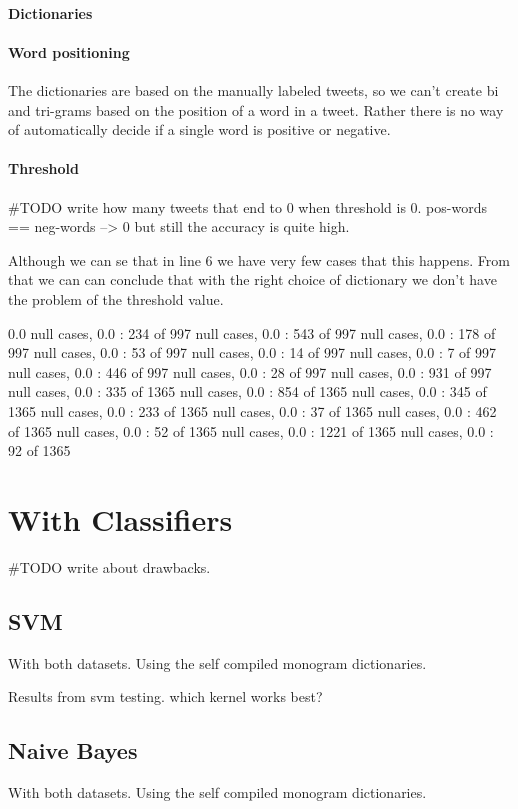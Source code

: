 \paragraph{Dictionaries}
\paragraph{Word positioning}
The dictionaries are based on the manually labeled
tweets, so we can't create bi and tri-grams based on the position of a word in a tweet.
Rather there is no way of automatically decide if a single word is positive or
negative. 

\paragraph{Threshold}
#TODO write how many tweets that end to 0 when threshold is 0.
pos-words == neg-words --> 0 but still the accuracy is quite high.

Although we can se that in line 6 we have very few cases that this happens.
From that we can can conclude that with the right choice of dictionary we don't
have the problem of the threshold value. 

0.0
null cases, 0.0 : 234 of 997
null cases, 0.0 : 543 of 997
null cases, 0.0 : 178 of 997
null cases, 0.0 : 53 of 997
null cases, 0.0 : 14 of 997
null cases, 0.0 : 7 of 997
null cases, 0.0 : 446 of 997
null cases, 0.0 : 28 of 997
null cases, 0.0 : 931 of 997
null cases, 0.0 : 335 of 1365
null cases, 0.0 : 854 of 1365
null cases, 0.0 : 345 of 1365
null cases, 0.0 : 233 of 1365
null cases, 0.0 : 37 of 1365
null cases, 0.0 : 462 of 1365
null cases, 0.0 : 52 of 1365
null cases, 0.0 : 1221 of 1365
null cases, 0.0 : 92 of 1365

\section{With Classifiers}

#TODO write about drawbacks. 

\subsection{SVM}\label{sentiment:svm_classification}
With both datasets.
Using the self compiled monogram dictionaries. 

Results from svm testing. which kernel works best?

\subsection{Naive Bayes}\label{sentiment:naive_bayes_classification}
With both datasets.
Using the self compiled monogram dictionaries. 


